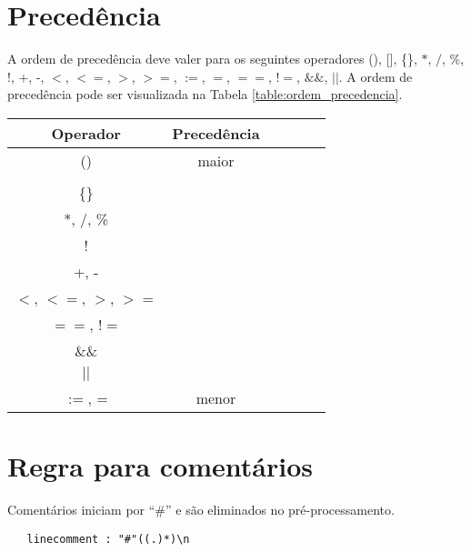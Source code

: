 \section{Precedência}
A ordem de precedência deve valer para os seguintes operadores (), [], \{\}, $*$, $/$, \%, !, +, -, $<$, $<=$, $>$, $>=$, $:=$, $=$, $==$, $!=$, $\&\&$, $||$. A ordem de precedência pode ser visualizada na Tabela \ref{table:ordem_precedencia}.

\begin{table*}[h]
\renewcommand{\arraystretch}{1.34}
\centering
\begin{tabular}{| c | c | c | c | c | c |}
\hline
\bfseries Operador & \bfseries Precedência  \\
\hline
() & maior \\ \hline
[] &  \\ \hline
\{\} &  \\ \hline
 *, /, \% & \\ \hline
  ! & \\ \hline
 +, - & \\ \hline
$<$, $<=$, $>$, $>=$ & \\ \hline
$==$, $!=$ & \\ \hline
\&\& & \\ \hline
$||$ & \\ \hline
$:=$, = & menor\\ \hline
\end{tabular}
\caption{Ordem de precedência para os operadores.}
\label{table:ordem_precedencia}
\end{table*}

\section{Regra para comentários}
    Comentários iniciam por ``\#'' e são eliminados no pré-processamento.
\begin{verbatim}
   linecomment : "#"((.)*)\n
\end{verbatim}
